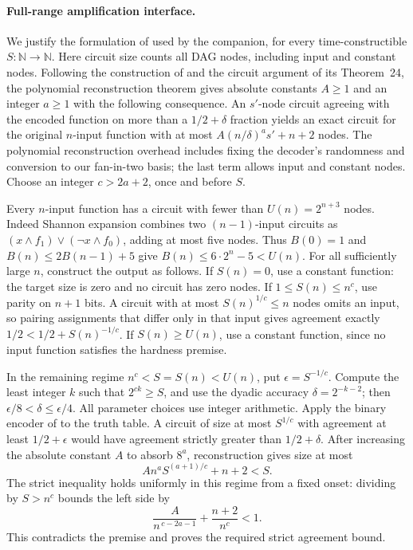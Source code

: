 \documentclass[11pt,letterpaper]{article}
\theoremstyle{definition}
\theoremstyle{remark}
\begin{document}
\paragraph{Full-range amplification interface.}
We justify the formulation of \cite[Lemma~3.9]{CLW20} used by the
companion, for every time-constructible \(S:\mathbb N\to\mathbb N\).
Here circuit size counts all DAG nodes, including input and constant
nodes. Following the construction of \cite[Lemmas~25 and~28]{STV01}
and the circuit argument of its Theorem~24, the polynomial
reconstruction theorem \cite[Theorem~29]{STV01} gives absolute constants
\(A\ge1\) and an integer \(a\ge1\) with the following consequence. An
\(s'\)-node circuit agreeing with the encoded function on more than
a \(1/2+\delta\) fraction yields an exact circuit for the original
\(n\)-input function with at most
\(A(n/\delta)^a s'+n+2\) nodes. The polynomial reconstruction
overhead includes fixing the decoder's randomness and conversion
to our fan-in-two basis; the last term allows input and constant
nodes. Choose an integer \(c>2a+2\), once and before \(S\).

Every \(n\)-input function has a circuit with fewer than
\(U(n)=2^{n+3}\) nodes. Indeed Shannon expansion combines two
\((n-1)\)-input circuits as
\((x\wedge f_1)\vee(\neg x\wedge f_0)\), adding at most five nodes.
Thus \(B(0)=1\) and \(B(n)\le2B(n-1)+5\) give
\(B(n)\le6\cdot2^n-5<U(n)\).
For all sufficiently large \(n\), construct the output as follows.
If \(S(n)=0\), use a constant function: the target size is zero and
no circuit has zero nodes. If \(1\le S(n)\le n^c\), use parity on
\(n+1\) bits. A circuit with at most \(S(n)^{1/c}\le n\) nodes
omits an input, so pairing assignments that differ only in that
input gives agreement exactly \(1/2<1/2+S(n)^{-1/c}\).
If \(S(n)\ge U(n)\), use a constant function, since no input
function satisfies the hardness premise.

In the remaining regime \(n^c<S=S(n)<U(n)\), put
\(\epsilon=S^{-1/c}\). Compute the least integer \(k\) such that
\(2^{ck}\ge S\), and use the dyadic accuracy
\(\delta=2^{-k-2}\); then
\(\epsilon/8<\delta\le\epsilon/4\).
All parameter choices use integer arithmetic. Apply the binary
encoder of \cite[Lemma~28]{STV01} to the truth table.
A circuit of size at most \(S^{1/c}\) with agreement at least
\(1/2+\epsilon\) would have agreement strictly greater than
\(1/2+\delta\). After increasing the absolute constant \(A\) to
absorb \(8^a\), reconstruction gives size at most
\[
 A n^a S^{(a+1)/c}+n+2<S.
\]
The strict inequality holds uniformly in this regime from a fixed
onset: dividing by \(S>n^c\) bounds the left side by
\[
 \frac{A}{n^{\,c-2a-1}}+\frac{n+2}{n^c}<1.
\]
This contradicts the premise and proves the required strict
agreement bound.
\end{document}
